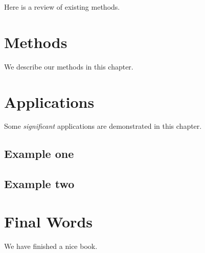 \documentclass[
]{book}
\begin{document}
Here is a review of existing methods.

\hypertarget{methods}{%
\chapter{Methods}\label{methods}}

We describe our methods in this chapter.

\hypertarget{applications}{%
\chapter{Applications}\label{applications}}

Some \emph{significant} applications are demonstrated in this chapter.

\hypertarget{example-one}{%
\section{Example one}\label{example-one}}

\hypertarget{example-two}{%
\section{Example two}\label{example-two}}

\hypertarget{final-words}{%
\chapter{Final Words}\label{final-words}}

We have finished a nice book.

  
\end{document}
